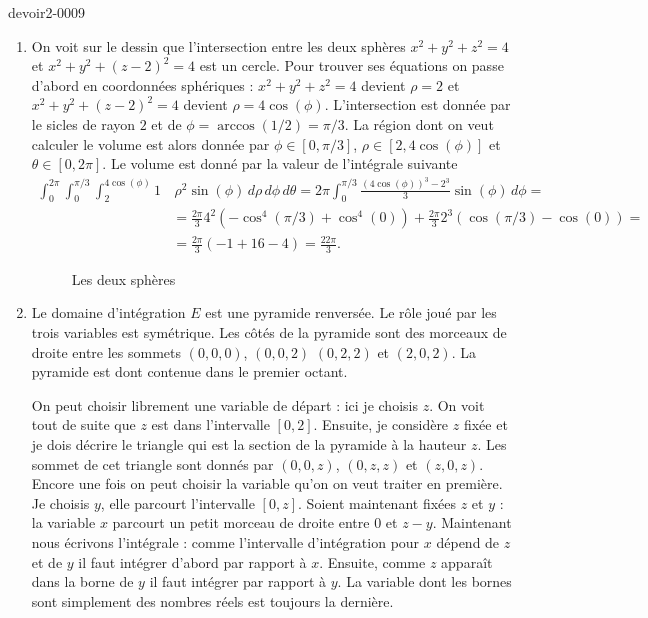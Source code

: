 \begin{corrige}{devoir2-0009}
  \begin{enumerate}
  \item On voit sur le dessin que l'intersection entre les deux sphères $x^2+y^2+z^2=4$ et $x^2+y^2+(z-2)^2=4$ est un cercle. Pour trouver ses équations on passe d'abord en coordonnées sphériques :  $x^2+y^2+z^2=4$ devient $\rho=2$ et $x^2+y^2+(z-2)^2=4$ devient $\rho= 4\cos(\phi)$. L'intersection est donnée par le sicles de rayon $2$ et de $\phi= \arccos(1/2)= \pi/3$. La région dont on veut calculer le volume est alors donnée par $\phi\in[0, \pi/3]$, $\rho\in[2, 4\cos(\phi)] $ et $\theta \in [0, 2\pi]$. Le volume est donné par la valeur de l'intégrale suivante
    \begin{equation}
      \begin{aligned}
        \int_0^{2\pi}\int_0^{\pi/3}\int_2^{4\cos(\phi)}1 & \, \rho^2\sin(\phi)\, d\rho \, d\phi \, d\theta = 2\pi \int_0^{\pi/3}\frac{(4\cos(\phi))^3-2^3}{3} \sin(\phi)\, d\phi= \\
&= \frac{2\pi}{3}4^2\left( -\cos^4(\pi/3)+\cos^4(0)\right)+ \frac{2\pi}{3}2^3 \left( \cos(\pi/3)-\cos(0)\right)=\\
&=\frac{2\pi}{3}(-1+16 - 4) = \frac{22\pi}{3}.
      \end{aligned}
    \end{equation}

    \begin{figure}
      \begin{center}
        \caption{Les deux sphères}\label{exo8devoir2}
      \end{center}
    \end{figure}
   
  \item Le domaine d'intégration $E$ est une pyramide renversée. Le rôle joué par les trois variables est symétrique. Les côtés de la pyramide sont des morceaux de droite entre les sommets $(0,0,0)$, $(0,0,2)$ $(0, 2, 2)$ et $(2, 0, 2)$. La pyramide est dont contenue dans le premier octant. 
 
On peut choisir librement  une variable de départ : ici je choisis $z$. On voit tout de suite que $z$ est dans l'intervalle $[0, 2]$. Ensuite, je considère $z$ fixée et je dois décrire le triangle qui est la section de la pyramide à la hauteur $z$. Les sommet de cet triangle sont donnés par $(0,0,z)$, $(0,z,z)$ et $(z,0,z)$. Encore une fois on peut choisir la variable qu'on on veut traiter en première. Je choisis $y$, elle parcourt l'intervalle $[0, z]$. Soient maintenant fixées $z$ et $y$ : la variable $x$ parcourt un petit morceau de droite entre $0$ et $z-y$. Maintenant nous écrivons l'intégrale : comme l'intervalle d'intégration pour $x$ dépend de $z$ et de $y$ il faut intégrer d'abord par rapport à $x$. Ensuite, comme $z$ apparaît dans la borne de $y$ il faut intégrer par rapport à $y$. La variable dont les bornes sont simplement des nombres réels est toujours la dernière.  


\end{enumerate}
\end{corrige}
